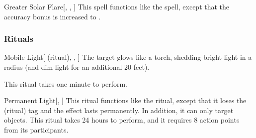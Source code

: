 \lowercase{\hypertarget{spell:Greater Solar Flare}{}}\label{spell:Greater Solar Flare}
\begin{freeability}[\nth{7}]{\hypertarget{spell:Greater Solar Flare}{Greater Solar Flare}}[, , ]
This spell functions like the  spell, except that the accuracy bonus is increased to .
\end{freeability}
\vspace{0.25em}



\subsubsection{Rituals}


\lowercase{\hypertarget{spell:Mobile Light}{}}\label{spell:Mobile Light}
\begin{attuneability}[\nth{1}]{\hypertarget{spell:Mobile Light}{Mobile Light}}[ (ritual), , ]
The target glows like a torch, shedding bright light in a \areamed radius (and dim light for an additional 20 feet).

This ritual takes one minute to perform.
\end{attuneability}
\vspace{0.25em}



\lowercase{\hypertarget{spell:Permanent Light}{}}\label{spell:Permanent Light}
\begin{apability}[\nth{2}]{\hypertarget{spell:Permanent Light}{Permanent Light}}[, ]
This ritual functions like the  ritual, except that it loses the  (ritual) tag and the effect lasts permanently.
In addition, it can only target objects.
This ritual takes 24 hours to perform, and it requires 8 action points from its participants.
\end{apability}
\vspace{0.25em}


